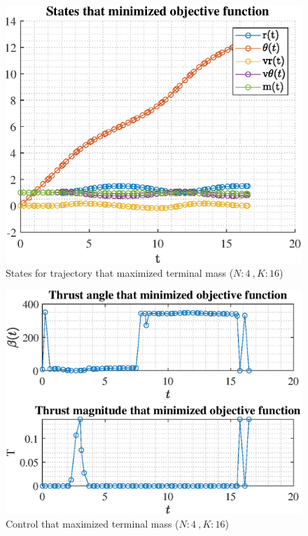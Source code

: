 \documentclass[]{article}
\begin{document}
\begin{figure}
	\centering
	\includegraphics[scale=0.75]{states_N4_K16_C2_mf.eps}
	\caption{States for trajectory that maximized terminal mass (\(N:4\ , K:16\))}
	\label{fig:states_N4_K16_C2_mf}
\end{figure}
\begin{figure}
	\centering
	\includegraphics[scale=0.75]{control_N4_K16_C2_mf.eps}
	\caption{Control that maximized terminal mass (\(N:4\ , K:16\))}
	\label{fig:control_N4_K16_C2_mf}
\end{figure}
\end{document}
